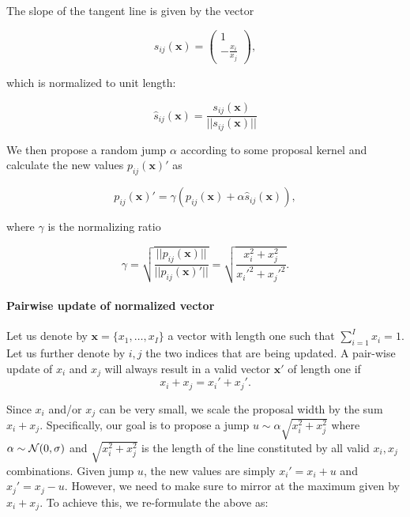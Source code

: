 \documentclass[a4paper,11pt]{article}
\def\x{\boldsymbol{x}}
\begin{document}
The slope of the tangent line is given by the vector

\begin{equation*}
 s_{ij}(\x) = \begin{pmatrix}
                 1 \\
                 -\frac{x_{i}}{x_{j}}
                \end{pmatrix},
\end{equation*}

which is normalized to unit length:

\begin{equation*}
 \hat{s}_{ij}(\x) = \frac{s_{ij}(\x)}{|| s_{ij}(\x) ||}
\end{equation*}

We then propose a random jump $\alpha$ according to some proposal kernel and calculate the new values $p_{ij}(\x)'$ as

\begin{equation*}
 p_{ij}(\x)' = \gamma \left( p_{ij}(\x) + \alpha \hat{s}_{ij}(\x) \right),
\end{equation*}

where $\gamma$ is the normalizing ratio

\begin{equation*}
 \gamma = \sqrt{\frac{||p_{ij}(\x)||}{||p_{ij}(\x)'||}} =  \sqrt{\frac{x_{i}^2 + x_{j}^2}{x_{i}'^2 + x_{j}'^2}}.
\end{equation*}

\paragraph{Pairwise update of normalized vector}

Let us denote by $\x = \{x_1, \ldots, x_I\}$ a vector with length one such that $\sum_{i=1}^I x_i = 1$. Let us further denote by $i,j$ the two indices that are being updated. A pair-wise update of $x_{i}$ and $x_{j}$ will always result in a valid vector $\x'$ of length one if
\begin{equation}
 x_{i} + x_{j} = x_{i}' + x_{j}'.
\end{equation}

Since $x_i$ and/or $x_j$ can be very small, we scale the proposal width by the sum $x_{i} + x_{j}$. Specifically, our goal is to propose a jump $u \sim \alpha \sqrt{x_i^2 + x_j^2}$ where $\alpha \sim {\cal N}(0, \sigma)$ and $\sqrt{x_i^2 + x_j^2}$ is the length of the line constituted by all valid $x_i, x_j$ combinations. Given jump $u$, the new values are simply $x_i' = x_i + u$ and $x_j' = x_j - u$. However, we need to make sure to mirror at the maximum given by $x_i + x_j$. To achieve this, we re-formulate the above as:
\end{document}
